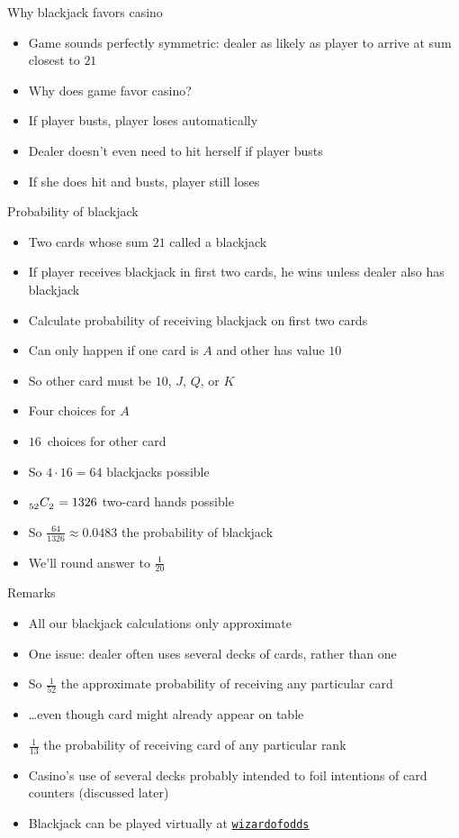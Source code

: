 \documentclass[handout]{beamer}
\theoremstyle{definition}
\newcommand\ncr[2]{\tensor[_{#1}]C{_{#2}}}
\begin{document}
\begin{frame}{Why blackjack favors casino}
\begin{itemize}
\item Game sounds perfectly symmetric: dealer as likely
as player to arrive at sum closest to $21$
\item Why does game favor casino?
\item If player busts, player loses automatically
\item Dealer doesn't even need to hit herself if player busts
\item If she does hit and busts, player still loses
\end{itemize}
\end{frame}

\begin{frame}{Probability of blackjack}
\begin{itemize}
\item Two cards whose sum $21$ called a \alert{blackjack}
\item If player receives blackjack in first two cards,
he wins unless dealer also has blackjack
\item Calculate probability of receiving blackjack on first two cards
\item Can only happen if one card is $A$ and other
has value $10$
\item So other card must be $10$, $J$, $Q$, or $K$
\item Four choices for $A$
\item $16$~choices for other card
\item So $4\cdot 16=64$ blackjacks possible
\item $\ncr{52}{2}=1326$ two-card hands possible 
\item So $\frac{64}{1326}\approx 0.0483$ the probability of blackjack
\item We'll round answer to $\frac{1}{20}$
\end{itemize}
\end{frame}

\begin{frame}{Remarks}
\begin{itemize}
\item All our blackjack calculations only approximate
\item One issue: dealer often uses several decks of cards, rather than one
\item So $\frac{1}{52}$ the
approximate probability of receiving any particular card
\item \dots even though card might already appear on table
\item $\frac{1}{13}$ the probability of receiving card
of any particular rank
\item Casino's use of several decks probably intended to foil
intentions of \alert{card counters} (discussed later)
\item Blackjack can be played virtually at
\href{http://wizardofodds.com/play/blackjack}{\color{blue}\tt wizardofodds}
\end{itemize}
\end{frame}
\end{document}
